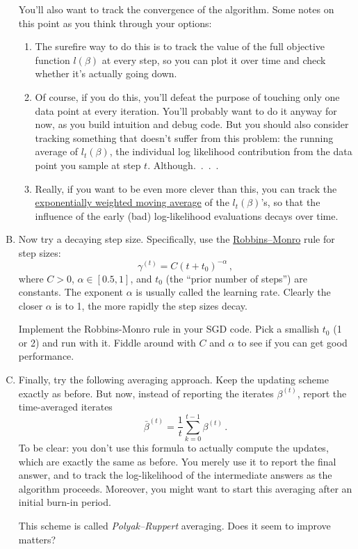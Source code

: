 \documentclass{mynotes}
\begin{document}
\begin{enumerate}[(A)]
You'll also want to track the convergence of the algorithm.  Some notes on this point as you think through your options:
\begin{enumerate}[1.]
\item The surefire way to do this is to track the value of the full objective function $l(\beta)$ at every step, so you can plot it over time and check whether it's actually going down.
\item Of course, if you do this, you'll defeat the purpose of touching only one data point at every iteration.  You'll probably want to do it anyway for now, as you build intuition and debug code.  But you should also consider tracking something that doesn't suffer from this problem: the running average of $l_t(\beta)$, the individual log likelihood contribution from the data point you sample at step $t$.  Although.~.~.~.
\item Really, if you want to be even more clever than this, you can track the \href{https://en.wikipedia.org/wiki/Moving_average#Exponential_moving_average}{exponentially weighted moving average} of the $l_t(\beta)$'s, so that the influence of the early (bad) log-likelihood evaluations decays over time.
\end{enumerate}


\item Now try a decaying step size.  Specifically, use the \href{https://en.wikipedia.org/wiki/Stochastic_approximation}{Robbins--Monro} rule for step sizes:
$$
\gamma^{(t)} = C (t + t_0)^{-\alpha} \, ,
$$
where $C > 0$, $\alpha \in [0.5, 1]$, and $t_0$ (the ``prior number of steps'') are constants.  The exponent $\alpha$ is usually called the learning rate.  Clearly the closer $\alpha$ is to 1, the more rapidly the step sizes decay.

Implement the Robbins-Monro rule in your SGD code. Pick a smallish $t_0$ (1 or 2) and run with it.   Fiddle around with $C$ and $\alpha$ to see if you can get good performance. 

\item Finally, try the following averaging approach.  Keep the updating scheme exactly as before.  But now, instead of reporting the iterates $\beta^{(t)}$, report the time-averaged iterates
$$
\bar{\beta}^{(t)} = \frac{1}{t} \sum_{k=0}^{t-1} \beta^{(t)} \, .
$$
To be clear: you don't use this formula to actually compute the updates, which are exactly the same as before.  You merely use it to report the final answer, and to track the log-likelihood of the intermediate answers as the algorithm proceeds.  Moreover, you might want to start this averaging after an initial burn-in period.

This scheme is called \textit{Polyak--Ruppert} averaging.  Does it seem to improve matters?

\end{enumerate}
\end{document}

